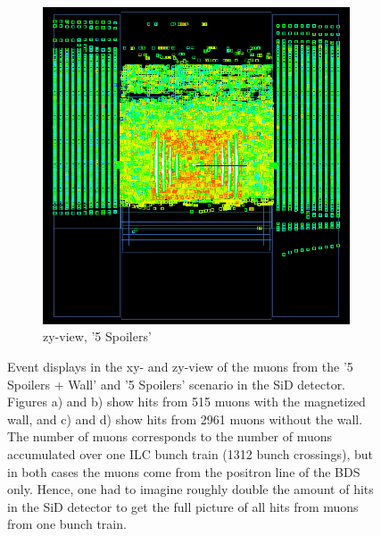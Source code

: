\begin{figure}
\begin{subfigure}[b]{0.49\textwidth}
\begin{center}
        \includegraphics[height=0.3\textheight]{figures/muons_positron_5spoilers_2961_zyview_croped.png}
        \caption{zy-view, '5 Spoilers'}
        \label{fig:zy_5Spoilers}
    \end{center}
    \end{subfigure}
    \caption[Event displays of muons in SiD]{
    Event displays in the xy- and zy-view of the muons from the '5 Spoilers + Wall' and '5 Spoilers' scenario in the SiD detector.
    Figures a) and b) show hits from 515 muons with the magnetized wall, and c) and d) show hits from 2961 muons without the wall.
    The number of muons corresponds to the number of muons accumulated over one ILC bunch train (1312 bunch crossings), but in both cases the muons come from the positron line of the BDS only.
    Hence, one had to imagine roughly double the amount of hits in the SiD detector to get the full picture of all hits from muons from one bunch train.
    }
    \label{fig:WIRED4}
\end{figure}

